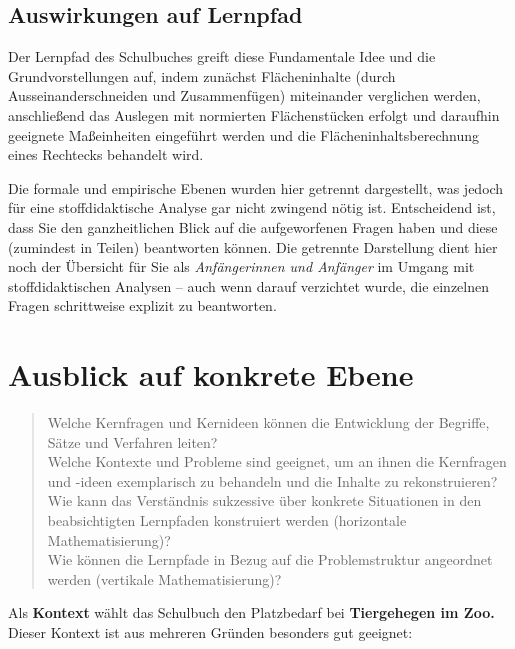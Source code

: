 \documentclass[
  ngerman,
]{scrbook}
\theoremstyle{definition}
\theoremstyle{definition}
\theoremstyle{definition}
\theoremstyle{definition}
\theoremstyle{remark}
\begin{document}
\hypertarget{auswirkungen-auf-lernpfad}{%
\subsection{Auswirkungen auf Lernpfad}\label{auswirkungen-auf-lernpfad}}

Der Lernpfad des Schulbuches greift diese Fundamentale Idee und die Grundvorstellungen auf, indem zunächst Flächeninhalte (durch Ausseinanderschneiden und Zusammenfügen) miteinander verglichen werden, anschließend das Auslegen mit normierten Flächenstücken erfolgt und daraufhin geeignete Maßeinheiten eingeführt werden und die Flächeninhaltsberechnung eines Rechtecks behandelt wird.

Die formale und empirische Ebenen wurden hier getrennt dargestellt, was jedoch für eine stoffdidaktische Analyse gar nicht zwingend nötig ist. Entscheidend ist, dass Sie den ganzheitlichen Blick auf die aufgeworfenen Fragen haben und diese (zumindest in Teilen) beantworten können. Die getrennte Darstellung dient hier noch der Übersicht für Sie als \emph{Anfängerinnen und Anfänger} im Umgang mit stoffdidaktischen Analysen -- auch wenn darauf verzichtet wurde, die einzelnen Fragen schrittweise explizit zu beantworten.

\hypertarget{ausblick-auf-konkrete-ebene}{%
\section{Ausblick auf konkrete Ebene}\label{ausblick-auf-konkrete-ebene}}

\begin{quote}
Welche Kernfragen und Kernideen können die Entwicklung der Begriffe, Sätze und Verfahren leiten?\\
Welche Kontexte und Probleme sind geeignet, um an ihnen die Kernfragen und -ideen exemplarisch zu behandeln und die Inhalte zu rekonstruieren?\\
Wie kann das Verständnis sukzessive über konkrete Situationen in den beabsichtigten Lernpfaden konstruiert werden (horizontale Mathematisierung)?\\
Wie können die Lernpfade in Bezug auf die Problemstruktur angeordnet werden (vertikale Mathematisierung)?
\end{quote}

Als \textbf{Kontext} wählt das Schulbuch den Platzbedarf bei \textbf{Tiergehegen im Zoo.} Dieser Kontext ist aus mehreren Gründen besonders gut geeignet:
\end{document}
